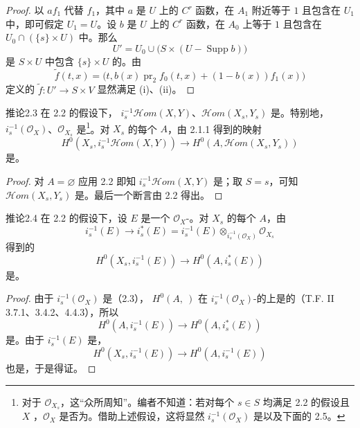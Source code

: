 \begin{proof}
以 $af_1$ 代替 $f_1$，其中 $a$ 是 $U$ 上的 $C^r$ 函数，在 $A_1$ 附近等于 $1$ 且包含在 $U_1$ 中，即可假定 $U_1=U$。设 $b$ 是 $U$ 上的 $C^r$ 函数，在 $A_0$ 上等于 $1$ 且包含在 $U_0\cap(\{s\}\times U)$ 中。那么
\[U'=U_0\cup\bigl(S\times(U-\operatorname{Supp}b)\bigr)\]
是 $S\times U$ 中包含 $\{s\}\times U$ 的。由
\[\widetilde f(t,x)=\bigl(t,b(x)\operatorname{pr}_2f_0(t,x)+(1-b(x))f_1(x)\bigr)\]
定义的 $\widetilde f:U'\to S\times V$ 显然满足 (i)、(ii)。
\end{proof}
\begin{SGAresult}{推论}{2.3}
在 2.2 的假设下， $i_s^{-1}\mathcal Hom(X,Y)$、$\mathcal Hom(X_s,Y_s)$ 是。特别地， $i_s^{-1}(\mathcal O_X)$、$\mathcal O_{X_s}$ 是\footnote{对于 $\mathcal O_{X_s}$，这“众所周知”。编者不知道：若对每个 $s\in S$ 均满足 2.2 的假设且 $X$ ，$\mathcal O_X$ 是否为。借助上述假设，这将显然 $i_s^{-1}(\mathcal O_X)$ 是以及下面的 2.5。}。对 $X_s$ 的每个 $A$，由 2.1.1 得到的映射
\[H^0(X_s,i_s^{-1}\mathcal Hom(X,Y))\longrightarrow H^0(A,\mathcal Hom(X_s,Y_s))\]
是。
\end{SGAresult}
\begin{proof}
对 $A=\varnothing$ 应用 2.2 即知 $i_s^{-1}\mathcal Hom(X,Y)$ 是；取 $S=s$，可知 $\mathcal Hom(X_s,Y_s)$ 是。最后一个断言由 2.2 得出。
\end{proof}
\begin{SGAresult}{推论}{2.4}
在 2.2 的假设下，设 $E$ 是一个 $\mathcal O_X$-。对 $X_s$ 的每个 $A$，由
\[i_s^{-1}(E)\longrightarrow i_s^*(E)=i_s^{-1}(E)\otimes_{i_s^{-1}(\mathcal O_X)}\mathcal O_{X_s}\]
得到的
\[H^0(X_s,i_s^{-1}(E))\longrightarrow H^0(A,i_s^*(E))\]
是。
\end{SGAresult}
\begin{proof}
由于 $i_s^{-1}(\mathcal O_X)$ 是（2.3）， $H^0(A,\ )$ 在 $i_s^{-1}(\mathcal O_X)$-的上是的（T.F. II 3.7.1、3.4.2、4.4.3），所以
\[H^0(A,i_s^{-1}(E))\longrightarrow H^0(A,i_s^*(E))\]
是。由于 $i_s^{-1}(E)$ 是，
\[H^0(X_s,i_s^{-1}(E))\longrightarrow H^0(A,i_s^{-1}(E))\]
也是，于是得证。
\end{proof}
